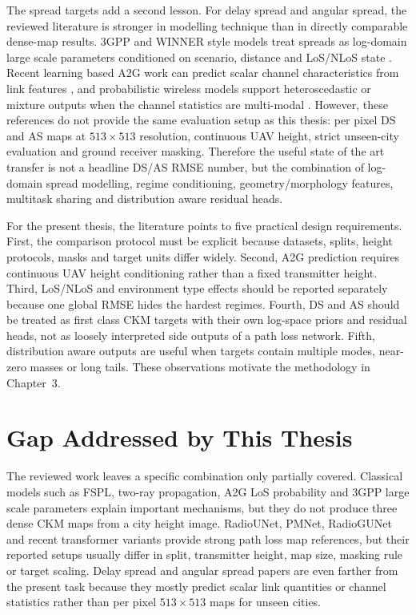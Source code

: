 The spread targets add a second lesson. For delay spread and angular spread,
the reviewed literature is stronger in modelling technique than in directly
comparable dense-map results. 3GPP and WINNER style models treat spreads as
log-domain large scale parameters conditioned on scenario, distance and
LoS/NLoS state \cite{tr38901,winner2}. Recent learning based A2G work can
predict scalar channel characteristics from link features
\cite{yang2019a2gml,huang2025a2gtransformer}, and probabilistic wireless
models support heteroscedastic or mixture outputs when the channel statistics
are multi-modal \cite{kendall2017uncertainties,saleh2021probabilistic,garciamarti2020mixture}.
However, these references do not provide the same evaluation setup as this thesis:
per pixel DS and AS maps at \(513\times513\) resolution, continuous UAV height,
strict unseen-city evaluation and ground receiver masking. Therefore the useful
state of the art transfer is not a headline DS/AS RMSE number, but the
combination of log-domain spread modelling, regime conditioning,
geometry/morphology features, multitask sharing and distribution aware residual
heads.

For the present thesis, the literature points to five practical design
requirements. First, the comparison protocol must be explicit because datasets,
splits, height protocols, masks and target units differ widely. Second, A2G
prediction requires continuous UAV height conditioning rather than a fixed
transmitter height. Third, LoS/NLoS and environment type effects should be
reported separately because one global RMSE hides the hardest regimes. Fourth,
DS and AS should be treated as first class CKM targets with their own log-space
priors and residual heads, not as loosely interpreted side outputs of a path
loss network. Fifth, distribution aware outputs are useful when targets contain
multiple modes, near-zero masses or long tails. These observations motivate the
methodology in Chapter~3.

\section{Gap Addressed by This Thesis}
\label{sec:soa_gap_synthesis}

The reviewed work leaves a specific combination only partially covered.
Classical models such as FSPL, two-ray propagation, A2G LoS probability and
3GPP large scale parameters explain important mechanisms, but they do not
produce three dense CKM maps from a city height image. RadioUNet, PMNet,
RadioGUNet and recent transformer variants provide strong path loss map
references, but their reported setups usually differ in split, transmitter
height, map size, masking rule or target scaling. Delay spread and angular
spread papers are even farther from the present task because they mostly
predict scalar link quantities or channel statistics rather than per pixel
\(513\times513\) maps for unseen cities.


